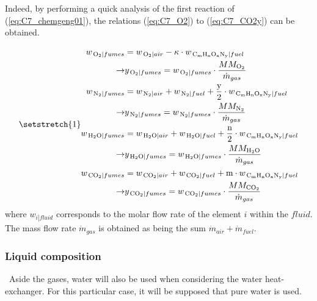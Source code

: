 Indeed, by performing a quick analysis of the first reaction of (\ref{eq:C7_chemgeng01}), the relations (\ref{eq:C7_O2}) to (\ref{eq:C7_CO2y}) can be obtained.

\begin{subequations}
\setstretch{1}
\begin{align}
    w_{\left.\ce{O2}\right|{fumes}} &= w_{\left.\ce{O2}\right|{air}} - \kappa\cdot w_{\left.\ce{C_{\text{m}}H_{\text{n}}O_{\text{x}}N_{\text{y}}}\right|{fuel}}\label{eq:C7_O2}\\
    \rightarrow & y_{\left.\ce{O2}\right|{fumes}} =  w_{\left.\ce{O2}\right|{fumes}}\cdot \frac{MM_{\ce{O2}}}{\dot{m}_{gas}}\label{eq:C7_O2y}\\
    w_{\left.\ce{N2}\right|{fumes}} &= w_{\left.\ce{N2}\right|{air}} + w_{\left.\ce{N2}\right|{fuel}} + \frac{\text{y}}{2}\cdot w_{\left.\ce{C_{\text{m}}H_{\text{n}}O_{\text{x}}N_{\text{y}}}\right|{fuel}}\label{eq:C7_N2}\\
    \rightarrow & y_{\left.\ce{N2}\right|{fumes}} =  w_{\left.\ce{N2}\right|{fumes}}\cdot \frac{MM_{\ce{N2}}}{\dot{m}_{gas}}\label{eq:C7_N2y}\\
    w_{\left.\ce{H2O}\right|{fumes}} &= w_{\left.\ce{H2O}\right|{air}} + w_{\left.\ce{H2O}\right|{fuel}} + \frac{\text{n}}{2}\cdot w_{\left.\ce{C_{\text{m}}H_{\text{n}}O_{\text{x}}N_{\text{y}}}\right|{fuel}}\label{eq:C7_H2O}\\
    \rightarrow & y_{\left.\ce{H2O}\right|{fumes}} =  w_{\left.\ce{H2O}\right|{fumes}}\cdot \frac{MM_{\ce{H2O}}}{\dot{m}_{gas}}\label{eq:C7_H2Oy}\\
    w_{\left.\ce{CO2}\right|{fumes}} &= w_{\left.\ce{CO2}\right|{air}} + w_{\left.\ce{CO2}\right|{fuel}} + \text{m}\cdot w_{\left.\ce{C_{\text{m}}H_{\text{n}}O_{\text{x}}N_{\text{y}}}\right|{fuel}}\label{eq:C7_CO2}\\
    \rightarrow & y_{\left.\ce{CO2}\right|{fumes}} =  w_{\left.\ce{CO2}\right|{fumes}}\cdot \frac{MM_{\ce{CO2}}}{\dot{m}_{gas}}\label{eq:C7_CO2y}
\end{align}\label{eq:C7_compfumes}
\end{subequations}
where $w_{\left.i\right|fluid}$ corresponds to the molar flow rate of the element $i$ within the $fluid$. The mass flow rate $\dot{m}_{gas}$ is obtained as being the sum $\dot{m}_{air}+\dot{m}_{fuel}$.

\subsubsection{Liquid composition}
\quad\ Aside the gases, water will also be used when considering the water heat-exchanger. For this particular case, it will be supposed that pure water is used.

